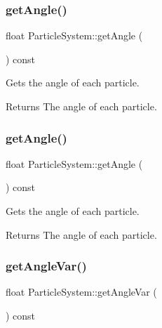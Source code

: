 \subsubsection{\texorpdfstring{get\+Angle()}{getAngle()}\hspace{0.1cm}{\footnotesize\ttfamily [1/2]}}
{\footnotesize\ttfamily float Particle\+System\+::get\+Angle (\begin{DoxyParamCaption}{ }\end{DoxyParamCaption}) const\hspace{0.3cm}{\ttfamily [inline]}}

Gets the angle of each particle.

\begin{DoxyReturn}{Returns}
The angle of each particle. 
\end{DoxyReturn}
\mbox{\label{classParticleSystem_a0dbc31c17a275c2e97ce9734e41c4b4d}} 
\subsubsection{\texorpdfstring{get\+Angle()}{getAngle()}\hspace{0.1cm}{\footnotesize\ttfamily [2/2]}}
{\footnotesize\ttfamily float Particle\+System\+::get\+Angle (\begin{DoxyParamCaption}{ }\end{DoxyParamCaption}) const\hspace{0.3cm}{\ttfamily [inline]}}

Gets the angle of each particle.

\begin{DoxyReturn}{Returns}
The angle of each particle. 
\end{DoxyReturn}
\mbox{\label{classParticleSystem_af95b74099e813301356d9de950c65b4b}} 
\subsubsection{\texorpdfstring{get\+Angle\+Var()}{getAngleVar()}\hspace{0.1cm}{\footnotesize\ttfamily [1/2]}}
{\footnotesize\ttfamily float Particle\+System\+::get\+Angle\+Var (\begin{DoxyParamCaption}{ }\end{DoxyParamCaption}) const\hspace{0.3cm}{\ttfamily [inline]}}

